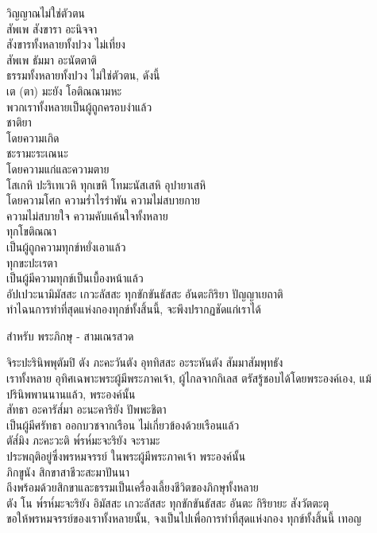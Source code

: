 \documentclass{article}
\begin{document}
\indent วิญญาณไม่ใช่ตัวตน\\
สัพเพ สังขารา อะนิจจา\\
\indent สังขารทั้งหลายทั้งปวง ไม่เที่ยง\\
สัพเพ ธัมมา อะนัตตาติ\\
\indent ธรรมทั้งหลายทั้งปวง ไม่ใช่ตัวตน, ดังนี้\\
เต (ตา)  มะยัง โอติณณามหะ\\
\indent พวกเราทั้งหลายเป็นผู้ถูกครอบงำแล้ว\\
ชาติยา\\
\indent โดยความเกิด\\
ชะรามะระเณนะ\\
\indent โดยความแก่และความตาย\\
โสเกหิ ปะริเทเวหิ ทุกเขหิ โทมะนัสเสหิ อุปายาเสหิ\\
\indent โดยความโศก ความร่ำไรรำพัน ความไม่สบายกาย\\
ความไม่สบายใจ ความคับแค้นใจทั้งหลาย\\
ทุกโขติณณา\\
\indent เป็นผู้ถูกความทุกข์หยั่งเอาแล้ว\\
ทุกขะปะเรตา\\
\indent เป็นผู้มีความทุกข์เป็นเบื้องหน้าแล้ว\\
อัปเปวะนามิมัสสะ เกวะลัสสะ ทุกขักขันธัสสะ อันตะกิริยา ปัญญาเยถาติ\\
\indent ทำไฉนการทำที่สุดแห่งกองทุกข์ทั้งสิ้นนี้, จะพึงปรากฏชัดแก่เราได้
\begin{center}สำหรับ พระภิกษุ - สามเณรสวด\end{center}
จิระปะรินิพพุตัมปิ ตัง ภะคะวันตัง อุททิสสะ อะระหันตัง สัมมาสัมพุทธัง\\
\indent เราทั้งหลาย อุทิศเฉพาะพระผู้มีพระภาคเจ้า, ผู้ไกลจากกิเลส
ตรัสรู้ชอบได้โดยพระองค์เอง, แม้ปรินิพพานนานแล้ว, พระองค์นั้น\\
สัทธา อะคารัส๎มา อะนะคาริยัง ปัพพะชิตา\\
\indent เป็นผู้มีศรัทธา ออกบวชจากเรือน ไม่เกี่ยวข้องด้วยเรือนแล้ว\\
ตัส๎มิง ภะคะวะติ พ๎รห๎มะจะริยัง จะรามะ\\
\indent ประพฤติอยู่ซึ่งพรหมจรรย์ ในพระผู้มีพระภาคเจ้า พระองค์นั้น\\
ภิกขูนัง สิกขาสาชีวะสะมาปันนา\\
\indent ถึงพร้อมด้วยสิกขาและธรรมเป็นเครื่องเลี้ยงชีวิตของภิกษุทั้งหลาย\\
ตัง โน พ๎รห๎มะจะริยัง อิมัสสะ เกวะลัสสะ ทุกขักขันธัสสะ อันตะ กิริยายะ สังวัตตะตุ\\
\indent ขอให้พรหมจรรย์ของเราทั้งหลายนั้น, จงเป็นไปเพื่อการทำที่สุดแห่งกอง ทุกข์ทั้งสิ้นนี้ เทอญ
\end{document}
